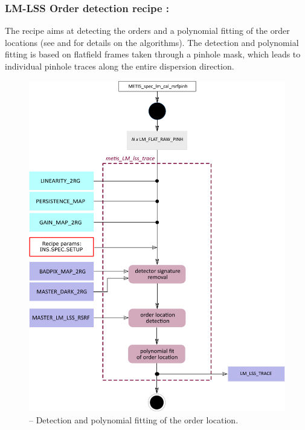 \subsubsection{LM-LSS Order detection recipe :}\label{rec:metis_lm_lss_trace}
The recipe \hyperref[rec:metis_lm_lss_trace]{} aims at detecting the orders and a polynomial fitting of the order locations (see \cite{pis02} and \cite{pis21} for details on the algorithms). The detection and polynomial fitting is based on flatfield frames taken through a pinhole mask, which leads to individual pinhole traces along the entire dispersion direction.

\begin{figure}[ht]
  \centering
  \includegraphics[width=0.5\textheight]{figures/metis_lm_lss_trace_v0.83.pdf}
  \caption[Recipe: ]{ --
    Detection and polynomial fitting of the order location.}
  \label{Fig:rec_lm_lss_wtrace}
\end{figure}

